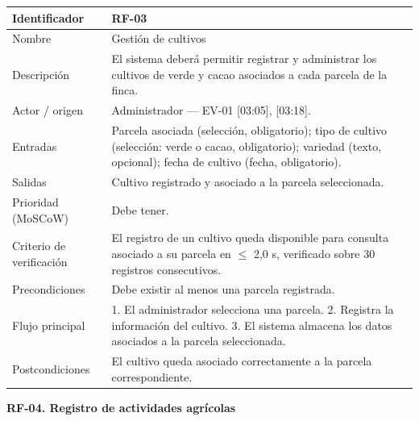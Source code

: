 \documentclass[12pt,a4paper]{article}
\begin{document}
\begin{center}
\begin{longtable}{|p{3.5cm}|p{10.7cm}|}
\hline
Identificador & RF-03 \\
\hline
Nombre & Gestión de cultivos \\
\hline
Descripción & El sistema deberá permitir registrar y administrar los cultivos de verde y cacao asociados a cada parcela de la finca. \\
\hline
Actor / origen & Administrador --- EV-01 [03:05], [03:18]. \\
\hline
Entradas & Parcela asociada (selección, obligatorio); tipo de cultivo (selección: verde o cacao, obligatorio); variedad (texto, opcional); fecha de cultivo (fecha, obligatorio). \\
\hline
Salidas & Cultivo registrado y asociado a la parcela seleccionada. \\
\hline
Prioridad (MoSCoW) & Debe tener. \\
\hline
Criterio de verificación & El registro de un cultivo queda disponible para consulta asociado a su parcela en $\leq$ 2,0 s, verificado sobre 30 registros consecutivos. \\
\hline
Precondiciones & Debe existir al menos una parcela registrada. \\
\hline
Flujo principal & 1. El administrador selecciona una parcela. 2. Registra la información del cultivo. 3. El sistema almacena los datos asociados a la parcela seleccionada. \\
\hline
Postcondiciones & El cultivo queda asociado correctamente a la parcela correspondiente. \\
\hline
\end{longtable}
\end{center}

\bigskip
\noindent\textbf{RF-04. Registro de actividades agrícolas}
\label{tab:RF-04}
\end{document}
